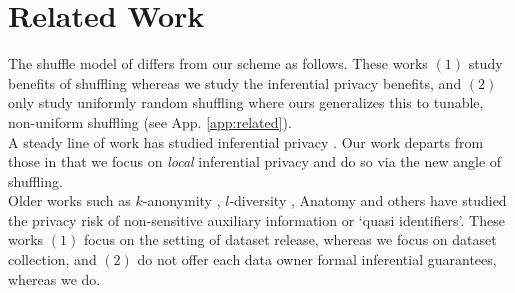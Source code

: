 \section{Related Work}\label{sec:related_work} \vspace{-0.3cm} 
The shuffle model of \DP \citep{Bittau2017,shuffle2,shuffling1} differs from our scheme as follows. These works $(1)$ study \DP benefits of shuffling whereas we study the inferential privacy benefits, and $(2)$ only study uniformly random shuffling where ours generalizes this to tunable, non-uniform shuffling (see App. \ref{app:related}). 
\\A steady line of work has studied inferential privacy  \citep{semantics, Kifer,  IP, Dalenius:1977, dwork2010on, sok}. %
Our work departs from those in that we focus on \emph{local} inferential privacy and do so via the new angle of shuffling. 
\\Older works such as $k$-anonymity \citep{kanon},  $l$-diversity \cite{ldiv}, Anatomy \citep{anatomy} and others \citep{older1, older2, older3, older4, older5} have studied the privacy risk of non-sensitive auxiliary information or `quasi identifiers'. These works $(1)$ focus on the setting of dataset release, whereas we focus on dataset collection, and $(2)$ do not offer each data owner formal inferential guarantees, whereas we do. %

